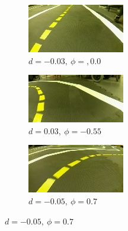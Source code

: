 \documentclass[11pt,letterpaper]{article}
\begin{document}
 \begin{figure}[h!]
 	\centering
 	\begin{subfigure}[b]{0.24\linewidth}
 		\includegraphics[width=\linewidth]{00008.jpg}
 		\caption{$d=-0.03,\ \phi=,0.0$}
 	\end{subfigure}
 	\begin{subfigure}[b]{0.24\linewidth}
 		\includegraphics[width=\linewidth]{00251.jpg}
 		\caption{$d=0.03,\ \phi=-0.55$}
 	\end{subfigure}
 	\begin{subfigure}[b]{0.24\linewidth}
 		\includegraphics[width=\linewidth]{00342.jpg}
 		\caption{$d=-0.05,\ \phi=0.7$}

\end{subfigure}
\end{figure}
\end{document}
